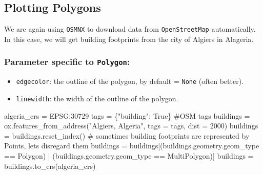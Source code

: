 \documentclass[
  letterpaper,
  DIV=11,
  numbers=noendperiod]{scrreprt}
\newenvironment{Shaded}{\begin{snugshade}}{\end{snugshade}}
\newcommand{\CommentTok}[1]{\textcolor[rgb]{0.37,0.37,0.37}{#1}}
\newcommand{\DecValTok}[1]{\textcolor[rgb]{0.68,0.00,0.00}{#1}}
\newcommand{\NormalTok}[1]{\textcolor[rgb]{0.00,0.23,0.31}{#1}}
\newcommand{\OperatorTok}[1]{\textcolor[rgb]{0.37,0.37,0.37}{#1}}
\newcommand{\StringTok}[1]{\textcolor[rgb]{0.13,0.47,0.30}{#1}}
\newcommand{\VariableTok}[1]{\textcolor[rgb]{0.07,0.07,0.07}{#1}}
\providecommand{\tightlist}{%
  \setlength{\itemsep}{0pt}\setlength{\parskip}{0pt}}\usepackage{longtable,booktabs,array}
\begin{document}
\subsection{Plotting Polygons}\label{plotting-polygons}

We are again using \texttt{OSMNX} to download data from
\texttt{OpenStreetMap} automatically. In this case, we will get building
footprints from the city of Algiers in Alageria.

\subsubsection{\texorpdfstring{Parameter specific to
\texttt{Polygon}:}{Parameter specific to Polygon:}}\label{parameter-specific-to-polygon}

\begin{itemize}
\tightlist
\item
  \texttt{edgecolor}: the outline of the polygon, by default =
  \texttt{None} (often better).
\item
  \texttt{linewidth}: the width of the outline of the polygon.
\end{itemize}

\begin{Shaded}
\begin{Highlighting}[]
\NormalTok{algeria\_crs }\OperatorTok{=} \StringTok{\textquotesingle{}EPSG:30729\textquotesingle{}}
\NormalTok{tags }\OperatorTok{=}\NormalTok{ \{}\StringTok{"building"}\NormalTok{: }\VariableTok{True}\NormalTok{\} }\CommentTok{\#OSM tags}
\NormalTok{buildings }\OperatorTok{=}\NormalTok{ ox.features\_from\_address(}\StringTok{"Algiers, Algeria"}\NormalTok{, tags }\OperatorTok{=}\NormalTok{ tags, dist }\OperatorTok{=} \DecValTok{2000}\NormalTok{) }
\NormalTok{buildings }\OperatorTok{=}\NormalTok{ buildings.reset\_index()}
 \CommentTok{\# sometimes building footprints are represented by Points, let\textquotesingle{}s disregard them}
\NormalTok{buildings }\OperatorTok{=}\NormalTok{ buildings[(buildings.geometry.geom\_type }\OperatorTok{==} \StringTok{\textquotesingle{}Polygon\textquotesingle{}}\NormalTok{) }\OperatorTok{|}\NormalTok{ (buildings.geometry.geom\_type }\OperatorTok{==} \StringTok{\textquotesingle{}MultiPolygon\textquotesingle{}}\NormalTok{)]}
\NormalTok{buildings }\OperatorTok{=}\NormalTok{ buildings.to\_crs(algeria\_crs)}
\end{Highlighting}
\end{Shaded}
\end{document}
